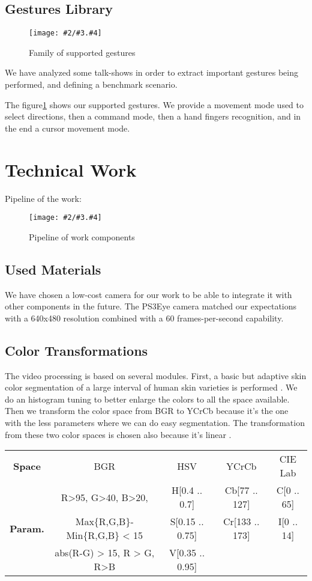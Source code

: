 \documentclass{llncs}
\newcommand\ignore[1]{}
\newcommand{\imagepathext}[5]{%
\begin{figure}[hbtp]
\hfil\texttt{[image: \#2/\#3.\#4]}\hfil
\caption{#5\label{#3}}
\end{figure}}
\newcommand{\png}[2]{\imagepathext{width=\columnwidth}{pics}{#1}{png}{#2}}
\begin{document}
\subsection{Gestures Library}

\png{handg}{Family of supported gestures}

We have analyzed some talk-shows in order to extract important gestures being performed, and defining a benchmark scenario. 

The figure\ref{handg} shows our supported gestures. We provide a movement mode
used to select directions, then a command mode, then a hand fingers recognition,
and in the end a cursor movement mode.

\ignore{
Explanation of the figures
Steps for skin-color based gesture detection
}

\section{Technical Work}
Pipeline of the work:
\png{pipeline}{Pipeline of work components}

\subsection{Used Materials}
We have chosen a low-cost camera for our work to be able to integrate it with other components in the future.
The PS3Eye camera matched our expectations with a 640x480 resolution combined with a 60 frames-per-second capability.

\ignore{
} 

\subsection{Color Transformations}
The video processing is based on several modules. First, a basic but adaptive skin color segmentation of a large interval of human skin varieties is performed \cite{skinColorSeg}.
We do an histogram tuning to better enlarge the colors to all the space available.
Then we transform the color space from BGR to YCrCb because it’s the one with the less parameters where we can do easy segmentation. The transformation from these two color spaces is chosen also because it’s linear \cite{skinColorSeg}.

\begin{center}
\begin{tabular}{|c|c|c|c|c|}
\textbf{Space} & BGR & HSV & YCrCb & CIE Lab\\
  & R>95, G>40, B>20, & H[0.4 .. 0.7] & Cb[77 .. 127] & C[0 .. 65] \\
\textbf{Param.} & Max\{R,G,B\}-Min\{R,G,B\} < 15 & S[0.15 .. 0.75] & Cr[133 .. 173] & I[0 .. 14] \\
  & abs(R-G) > 15, R > G, R>B & V[0.35 .. 0.95] & &
\end{tabular}
\end{center}
\end{document}
